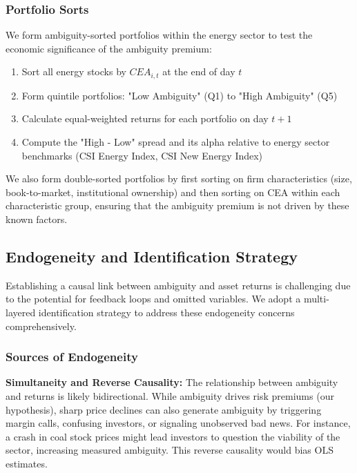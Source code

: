 \documentclass[preprint,12pt,authoryear]{elsarticle}
\begin{document}
\subsubsection{Portfolio Sorts}

We form ambiguity-sorted portfolios within the energy sector to test the economic significance of the ambiguity premium:
\begin{enumerate}
\item Sort all energy stocks by $CEA_{i,t}$ at the end of day $t$
\item Form quintile portfolios: "Low Ambiguity" (Q1) to "High Ambiguity" (Q5)
\item Calculate equal-weighted returns for each portfolio on day $t+1$
\item Compute the "High - Low" spread and its alpha relative to energy sector benchmarks (CSI Energy Index, CSI New Energy Index)
\end{enumerate}

We also form double-sorted portfolios by first sorting on firm characteristics (size, book-to-market, institutional ownership) and then sorting on CEA within each characteristic group, ensuring that the ambiguity premium is not driven by these known factors.

\subsection{Endogeneity and Identification Strategy}

Establishing a causal link between ambiguity and asset returns is challenging due to the potential for feedback loops and omitted variables. We adopt a multi-layered identification strategy to address these endogeneity concerns comprehensively.

\subsubsection{Sources of Endogeneity}

\textbf{Simultaneity and Reverse Causality:} The relationship between ambiguity and returns is likely bidirectional. While ambiguity drives risk premiums (our hypothesis), sharp price declines can also generate ambiguity by triggering margin calls, confusing investors, or signaling unobserved bad news. For instance, a crash in coal stock prices might lead investors to question the viability of the sector, increasing measured ambiguity. This reverse causality would bias OLS estimates.
\end{document}
